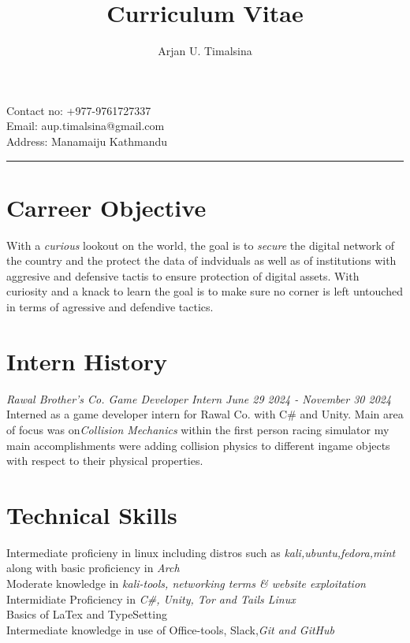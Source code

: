 \documentclass[20pt,a4paper]{article}
\begin{document}
\title{Curriculum Vitae} 
\date{}
\author{Arjan U. Timalsina}
\maketitle
\begin{flushright}
Contact no: +977-9761727337 \\
Email: aup.timalsina@gmail.com \\
Address: Manamaiju Kathmandu \\
\end{flushright}
\hrule
\section*{Carreer Objective}
With a \emph{curious} lookout on the world, the goal is to \emph{secure} the digital network of the country and the protect the data of indviduals as well as of institutions with aggresive and defensive tactis to ensure protection of digital assets. With curiosity and a knack to learn the goal is to make sure no corner is left untouched in terms of agressive and defendive tactics.
\section*{Intern History}
\emph{Rawal Brother's Co. \emph{Game Developer Intern}
June 29 2024 - November 30 2024}\\
Interned as a game developer intern for Rawal Co. with C\# and Unity. Main area of focus was on\emph{Collision Mechanics} within the first person racing simulator my main accomplishments were adding collision physics to different ingame objects with respect to their physical properties.

\section*{Technical Skills}
\textbullet \hspace{5pt} Intermediate proficieny in linux including distros such as \emph{kali,ubuntu,fedora,mint} along with basic proficiency in \emph{Arch}\\
\textbullet \hspace{5pt} Moderate knowledge in \emph{kali-tools, networking terms \& \emph{website exploitation}}\\
\textbullet \hspace{5pt} Intermidiate Proficiency in \emph{C\#, Unity, Tor and Tails Linux}\\
\textbullet \hspace{5pt} Basics of LaTex and TypeSetting\\
\textbullet \hspace{5pt} Intermediate knowledge in use of Office-tools, Slack,\emph{Git and GitHub}\\
\end{document}
